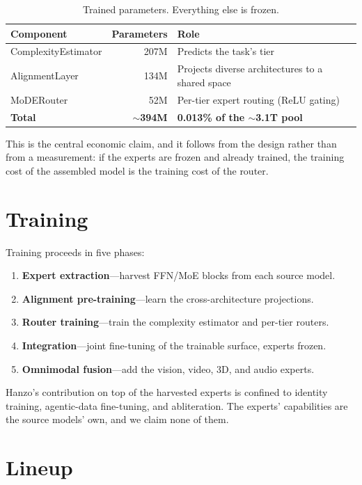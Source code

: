 \documentclass[11pt,a4paper]{article}
\begin{document}
\begin{table}[H]
\centering
\caption{Trained parameters. Everything else is frozen.}
\begin{tabular}{lrl}
\toprule
\textbf{Component} & \textbf{Parameters} & \textbf{Role} \\
\midrule
ComplexityEstimator & 207M & Predicts the task's tier \\
AlignmentLayer      & 134M & Projects diverse architectures to a shared space \\
MoDERouter          & 52M  & Per-tier expert routing (ReLU gating) \\
\midrule
\textbf{Total} & \textbf{$\sim$394M} & \textbf{0.013\% of the $\sim$3.1T pool} \\
\bottomrule
\end{tabular}
\end{table}

This is the central economic claim, and it follows from the design rather than from a
measurement: if the experts are frozen and already trained, the training cost of the
assembled model is the training cost of the router.

\section{Training}

Training proceeds in five phases:

\begin{enumerate}
  \item \textbf{Expert extraction}---harvest FFN/MoE blocks from each source model.
  \item \textbf{Alignment pre-training}---learn the cross-architecture projections.
  \item \textbf{Router training}---train the complexity estimator and per-tier routers.
  \item \textbf{Integration}---joint fine-tuning of the trainable surface, experts frozen.
  \item \textbf{Omnimodal fusion}---add the vision, video, 3D, and audio experts.
\end{enumerate}

Hanzo's contribution on top of the harvested experts is confined to identity training,
agentic-data fine-tuning, and abliteration. The experts' capabilities are the source
models' own, and we claim none of them.

\section{Lineup}
\end{document}

